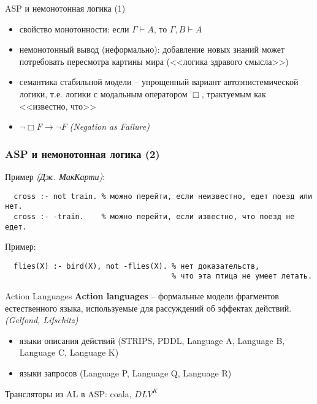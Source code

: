 \documentclass{beamer}
\begin{document}
\begin{frame}{ASP и немонотонная логика (1)}
\begin{itemize}
  \item свойство монотонности: если $\Gamma \vdash A$, то $\Gamma, B \vdash A$
  \item немонотонный вывод (неформально): добавление новых знаний может потребовать пересмотра картины мира (<<логика здравого смысла>>)
  \item семантика стабильной модели -- упрощенный вариант автоэпистемической логики, т.е. логики с модальным оператором $\Box$, трактуемым как <<известно, что>>
  \item $\neg \Box F \rightarrow \neg F$ \textit{(Negation as Failure)}
\end{itemize}
\end{frame}

\begin{frame}[fragile]
\frametitle{ASP и немонотонная логика (2)}
Пример \textit{(Дж. МакКарти)}:
{\scriptsize \begin{verbatim}
  cross :- not train. % можно перейти, если неизвестно, едет поезд или нет.
  cross :- -train.    % можно перейти, если известно, что поезд не едет.
\end{verbatim}}

Пример:
{\scriptsize \begin{verbatim}
  flies(X) :- bird(X), not -flies(X). % нет доказательств, 
                                      % что эта птица не умеет летать.
\end{verbatim}}

\end{frame}

\begin{frame}{Action Languages}
\textbf{Action languages} -- формальные модели фрагментов естественного языка, используемые для рассуждений об эффектах действий. \textit{(Gelfond, Lifschitz)}\bigskip

\begin{itemize}
  \item языки описания действий (STRIPS, PDDL, Language A, Language B, Language C, Language K)
  \item языки запросов (Language P, Language Q, Language R)
\end{itemize}\bigskip

Трансляторы из AL в ASP: coala, $DLV^K$
\end{frame}
\end{document}
